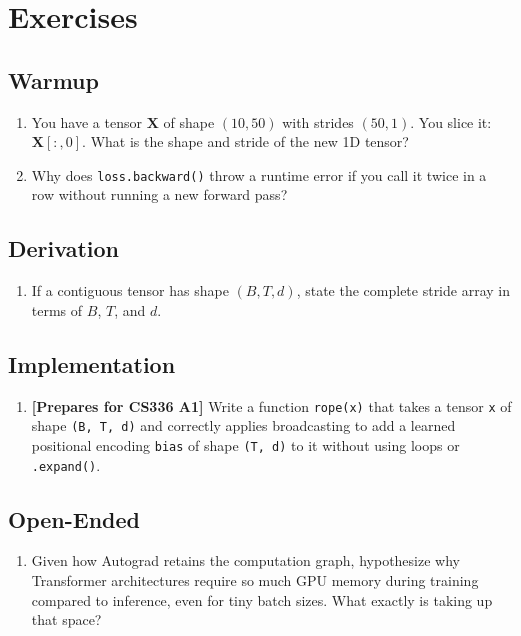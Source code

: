 \section{Exercises}
\label{ch:03:sec:exercises}

\subsection*{Warmup}
\begin{enumerate}
  \item You have a tensor $\mathbf{X}$ of shape $(10, 50)$ with strides $(50, 1)$. You slice it: $\mathbf{X}[:, 0]$. What is the shape and stride of the new 1D tensor?
  \item Why does \texttt{loss.backward()} throw a runtime error if you call it twice in a row without running a new forward pass?
\end{enumerate}

\subsection*{Derivation}
\begin{enumerate}
  \item If a contiguous tensor has shape $(B, T, d)$, state the complete stride array in terms of $B$, $T$, and $d$. 
\end{enumerate}

\subsection*{Implementation}
\begin{enumerate}
  \item \textbf{[Prepares for CS336 A1]} Write a function \texttt{rope(x)} that takes a tensor \texttt{x} of shape \texttt{(B, T, d)} and correctly applies broadcasting to add a learned positional encoding \texttt{bias} of shape \texttt{(T, d)} to it without using loops or \texttt{.expand()}.
\end{enumerate}

\subsection*{Open-Ended}
\begin{enumerate}
  \item Given how Autograd retains the computation graph, hypothesize why Transformer architectures require so much GPU memory during training compared to inference, even for tiny batch sizes. What exactly is taking up that space?
\end{enumerate}

